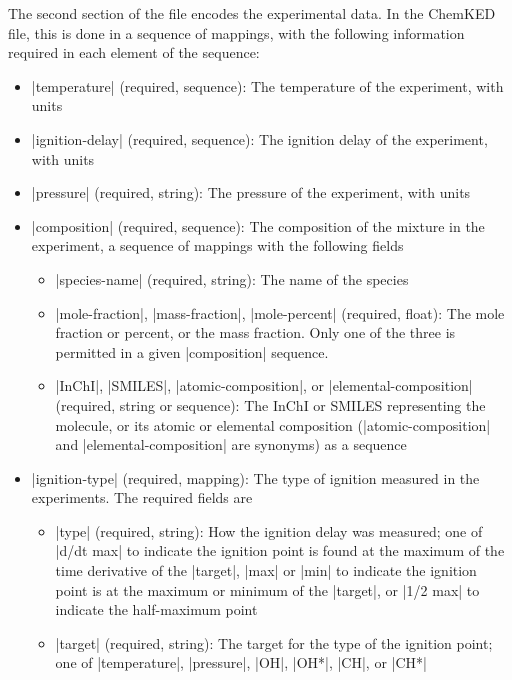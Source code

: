 \documentclass[12pt]{ijck}
\newcommand\ck{ChemKED}
\begin{document}
The second section of the file encodes the experimental data. In the \ck{} file,
this is done in a sequence of mappings, with the following information required
in each element of the sequence:
%
\begin{itemize}
    \item \yabox|temperature| (required, sequence): The temperature of the
    experiment, with units
    \item \yabox|ignition-delay| (required, sequence): The ignition delay of the
    experiment, with units
    \item \yabox|pressure| (required, string): The pressure of the experiment,
    with units
    \item \yabox|composition| (required, sequence): The composition of the
    mixture in the experiment, a sequence of mappings with the following fields
    \begin{itemize}
        \item \yabox|species-name| (required, string): The name of the species
        \item \yabox|mole-fraction|, \yabox|mass-fraction|, \yabox|mole-percent|
        (required, float): The mole fraction or percent, or the mass fraction.
        Only one of the three is permitted in a given \yabox|composition|
        sequence.
        \item \yabox|InChI|, \yabox|SMILES|, \yabox|atomic-composition|, or
        \yabox|elemental-composition| (required, string or sequence): The InChI
        or SMILES representing the molecule, or its atomic or elemental
        composition (\yabox|atomic-composition| and
        \yabox|elemental-composition| are synonyms) as a sequence
    \end{itemize}
    \item \yabox|ignition-type| (required, mapping): The type of ignition
    measured in the experiments. The required fields are
    \begin{itemize}
        \item \yabox|type| (required, string): How the ignition delay was
        measured; one of \yabox|d/dt max| to indicate the ignition point is
        found at the maximum of the time derivative of the \yabox|target|,
        \yabox|max| or \yabox|min| to indicate the ignition point is at the
        maximum or minimum of the \yabox|target|, or \yabox|1/2 max| to
        indicate the half-maximum point
        \item \yabox|target| (required, string): The target for the type of the
        ignition point; one of \yabox|temperature|, \yabox|pressure|,
        \yabox|OH|, \yabox|OH*|, \yabox|CH|, or \yabox|CH*|
    \end{itemize}
\end{itemize}
\end{document}
